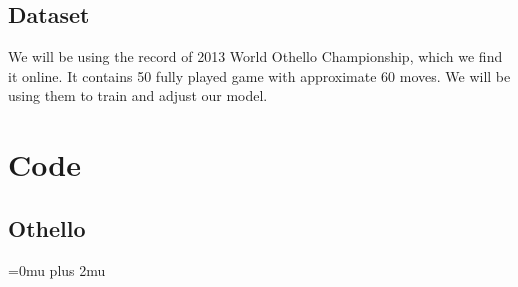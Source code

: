 \documentclass[aps,pra,preprint,amsmath,amssymb,floatfix]{revtex4-2}
\begin{document}
\subsection{Dataset}
We will be using the record of 2013 World Othello Championship, which we find it online.\cite{othello_dataset}  It contains 50 fully played game with approximate 60 moves. We will be using them to train and adjust our model.

\section{Code}
\subsection{Othello}



\nocite{*}
\Urlmuskip=0mu plus 2mu\relax


\end{document}
